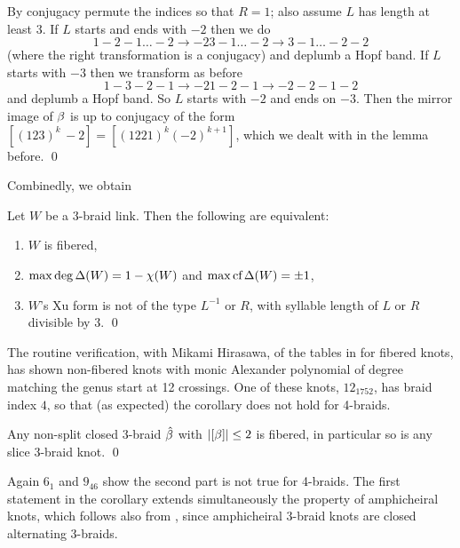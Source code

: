 By conjugacy permute the indices so that $R=1$; also assume $L$ has
length at least $3$. If $L$ starts and ends with $-2$ then we do
\[
1 -2 -1 \dots -2 \to -2 3 -1 \dots -2\to 3 -1 \dots -2 -2
\]
(where the right transformation is a conjugacy) and deplumb a
Hopf band. If $L$ starts with $-3$ then we transform as before
\[
1 -3 -2 -1\to -2 1 -2 -1\to -2 -2 -1 -2
\]
and deplumb a Hopf band. So $L$ starts with $-2$ and ends on $-3$.
Then the mirror image of $\beta$ is up to conjugacy of the form
$[(123)^k\,-2]=[(1 2 2 1)^k (-2)^{k+1}]$, which we dealt with in
the lemma before.  \qed

Combinedly, we obtain

\begin{corr}
Let $W$ be a 3-braid link. Then the following are equivalent:
\def\labelenumi{\theenumi)}
\begin{enumerate}
\item $W$ is fibered,
\item $\max\deg\Delta(W)=1-\chi(W)$ and $\max\text{\rm cf}\,\Delta(W)=\pm 1$,
\item $W$'s Xu form is not of the type $L^{-1}$ or $R$,
with syllable length of $L$ or $R$ divisible by $3$. \qed
\end{enumerate}
\end{corr}

\begin{exam}
The routine verification, with Mikami Hirasawa, of the tables in
\cite{KnotScape} for fibered knots, has shown non-fibered knots 
with monic Alexander polynomial of degree matching the genus
start at 12 crossings. One of these knots, $12_{1752}$, has
braid index $4$, so that (as expected) the corollary does not
hold for 4-braids.
\end{exam}

\begin{corr}
Any non-split closed 3-braid $\hat{\beta}$ with $|[\beta]|\le 2$ is fibered,
in particular so is any slice 3-braid knot. \qed
\end{corr}

Again $6_1$ and $9_{46}$ show the second part is not true for 4-braids.
The first statement in the corollary extends simultaneously
the property of amphicheiral knots, which follows also
from \cite{BirMen}, since amphicheiral 3-braid
knots are closed alternating 3-braids.

